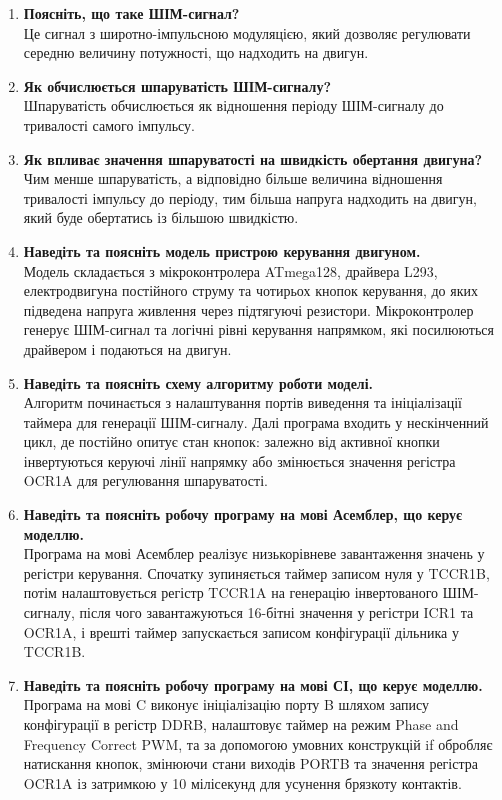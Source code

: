 \documentclass[14pt, a4paper]{extreport}
\begin{document}
\begin{enumerate}
		\item \textbf{Поясніть, що таке ШІМ-сигнал?} \\ Це сигнал з широтно-імпульсною модуляцією, який дозволяє регулювати середню величину потужності, що надходить на двигун.
		
		\item \textbf{Як обчислюється шпаруватість ШІМ-сигналу?} \\ Шпаруватість обчислюється як відношення періоду ШІМ-сигналу до тривалості самого імпульсу.
		
		\item \textbf{Як впливає значення шпаруватості на швидкість обертання двигуна?} \\ Чим менше шпаруватість, а відповідно більше величина відношення тривалості імпульсу до періоду, тим більша напруга надходить на двигун, який буде обертатись із більшою швидкістю.
		
		\item \textbf{Наведіть та поясніть модель пристрою керування двигуном.} \\ Модель складається з мікроконтролера ATmega128, драйвера L293, електродвигуна постійного струму та чотирьох кнопок керування, до яких підведена напруга живлення через підтягуючі резистори. Мікроконтролер генерує ШІМ-сигнал та логічні рівні керування напрямком, які посилюються драйвером і подаються на двигун.
		
		\item \textbf{Наведіть та поясніть схему алгоритму роботи моделі.} \\ Алгоритм починається з налаштування портів виведення та ініціалізації таймера для генерації ШІМ-сигналу. Далі програма входить у нескінченний цикл, де постійно опитує стан кнопок: залежно від активної кнопки інвертуються керуючі лінії напрямку або змінюється значення регістра OCR1A для регулювання шпаруватості.
		
		\item \textbf{Наведіть та поясніть робочу програму на мові Асемблер, що керує моделлю.} \\ Програма на мові Асемблер реалізує низькорівневе завантаження значень у регістри керування. Спочатку зупиняється таймер записом нуля у TCCR1B, потім налаштовується регістр TCCR1A на генерацію інвертованого ШІМ-сигналу, після чого завантажуються 16-бітні значення у регістри ICR1 та OCR1A, і врешті таймер запускається записом конфігурації дільника у TCCR1B.
		
		\item \textbf{Наведіть та поясніть робочу програму на мові СІ, що керує моделлю.} \\ Програма на мові C виконує ініціалізацію порту B шляхом запису конфігурації в регістр DDRB, налаштовує таймер на режим Phase and Frequency Correct PWM, та за допомогою умовних конструкцій if обробляє натискання кнопок, змінюючи стани виходів PORTB та значення регістра OCR1A із затримкою у 10 мілісекунд для усунення брязкоту контактів.
	\end{enumerate}
	
\end{document}
